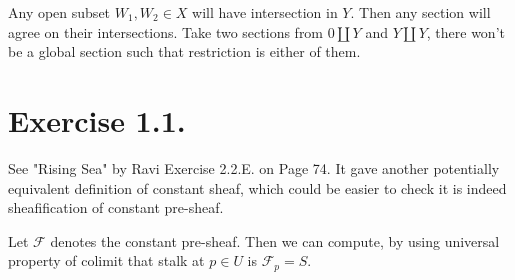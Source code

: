 Any open subset $W_1, W_2\in X$ will have intersection in $Y$. Then any section will agree on their intersections. Take two sections from $0\amalg Y$ and $Y\amalg Y$, there won't be a global section such that restriction is either of them.

\section{Exercise 1.1.}

See "Rising Sea" by Ravi Exercise 2.2.E. on Page 74. It gave another potentially equivalent definition of constant sheaf, which could be easier to check it is indeed sheafification of constant pre-sheaf.

Let $\mathscr F$ denotes the constant pre-sheaf. Then we can compute, by using universal property of colimit that stalk at $p\in U$ is $\mathscr F_p=S$. 

